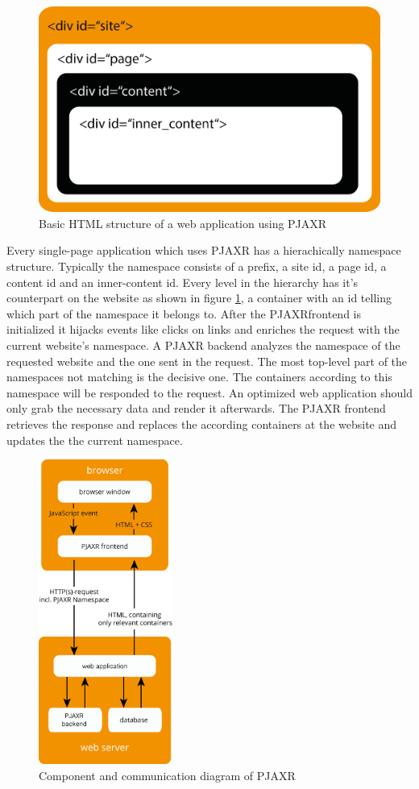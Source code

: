 \documentclass[f,bachelor,binding,twoside,palatino]{WeSTthesis}
\def \pjaxr {PJAXR}
\def \singlePageApplication {single-page application}
\begin{document}
  \begin{figure}[H]
    \centering
    \includegraphics[width=13cm]{images/pjaxr_html.png}
    \caption[pjaxr_html]{Basic HTML structure of a web application using \pjaxr{}}
    \label{fig:pjaxr_html}
  \end{figure}

  Every \singlePageApplication{} which uses \pjaxr{} has a hierachically namespace structure.
  Typically the namespace consists of a prefix, a site id, a page id, a content id and an inner-content id.
  Every level in the hierarchy has it's counterpart on the website as shown in figure \ref{fig:pjaxr_html}, a container with an id telling which part of the namespace it belongs to.
  After the \pjaxr frontend is initialized it hijacks events like clicks on links and enriches the request with the current website's namespace.
  A \pjaxr{} backend analyzes the namespace of the requested website and the one sent in the request.
  The most top-level part of the namespaces not matching is the decisive one.
  The containers according to this namespace will be responded to the request.
  An optimized web application should only grab the necessary data and render it afterwards.
  The \pjaxr{} frontend retrieves the response and replaces the according containers at the website and updates the the current namespace.
  
  \begin{figure}[H]
    \centering
    \includegraphics[height=10cm]{images/pjaxr.png}
    \caption[pjaxr_components]{Component and communication diagram of \pjaxr{}}
  \end{figure}
  
\end{document}
